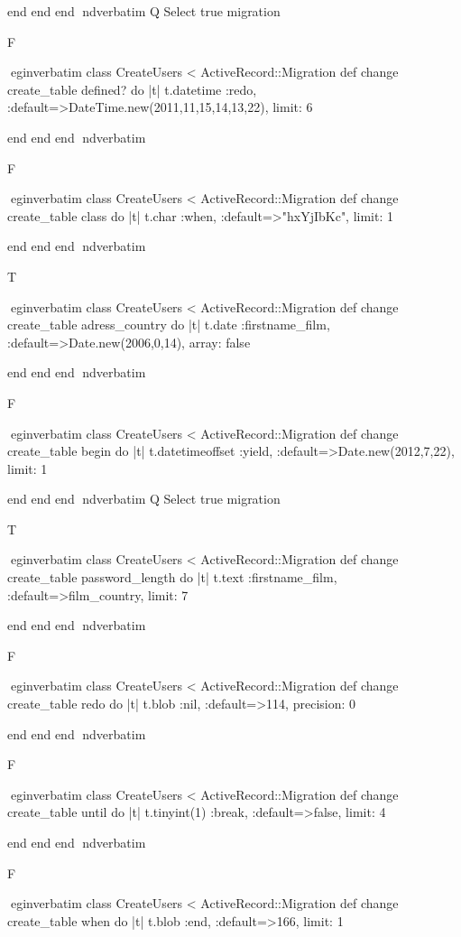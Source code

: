    end 
  end 
end
nd{verbatim}
Q
 Select true migration

F

egin{verbatim}
 class CreateUsers < ActiveRecord::Migration 
  def change 
    create_table defined? do |t| 
      t.datetime :redo, :default=>DateTime.new(2011,11,15,14,13,22), limit: 6
    
    end 
  end 
end
nd{verbatim}

F

egin{verbatim}
 class CreateUsers < ActiveRecord::Migration 
  def change 
    create_table class do |t| 
      t.char :when, :default=>"hxYjIbKc", limit: 1
    
    end 
  end 
end
nd{verbatim}

T

egin{verbatim}
 class CreateUsers < ActiveRecord::Migration 
  def change 
    create_table adress_country do |t| 
      t.date :firstname_film, :default=>Date.new(2006,0,14), array: false
    
    end 
  end 
end
nd{verbatim}

F

egin{verbatim}
 class CreateUsers < ActiveRecord::Migration 
  def change 
    create_table begin do |t| 
      t.datetimeoffset :yield, :default=>Date.new(2012,7,22), limit: 1
    
    end 
  end 
end
nd{verbatim}
Q
 Select true migration

T

egin{verbatim}
 class CreateUsers < ActiveRecord::Migration 
  def change 
    create_table password_length do |t| 
      t.text :firstname_film, :default=>film_country, limit: 7
    
    end 
  end 
end
nd{verbatim}

F

egin{verbatim}
 class CreateUsers < ActiveRecord::Migration 
  def change 
    create_table redo do |t| 
      t.blob :nil, :default=>114, precision: 0
    
    end 
  end 
end
nd{verbatim}

F

egin{verbatim}
 class CreateUsers < ActiveRecord::Migration 
  def change 
    create_table until do |t| 
      t.tinyint(1) :break, :default=>false, limit: 4
    
    end 
  end 
end
nd{verbatim}

F

egin{verbatim}
 class CreateUsers < ActiveRecord::Migration 
  def change 
    create_table when do |t| 
      t.blob :end, :default=>166, limit: 1
    

